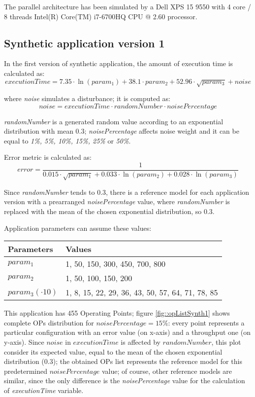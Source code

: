 The parallel architecture has been simulated by a Dell XPS 15 9550 with 4 core / 8 threads Intel(R) Core(TM) i7-6700HQ CPU @ 2.60 processor.


\subsection{Synthetic application version 1}

In the first version of synthetic application, the amount of execution time is calculated as:
\[
executionTime = 7.35 \cdot \ln{(param_1)} + 38.1 \cdot param_2 + 52.96 \cdot \sqrt{param_3} + noise
\]

where \textit{noise} simulates a disturbance; it is computed as:
\[
noise = executionTime \cdot randomNumber \cdot noisePercentage
\]

\textit{randomNumber} is a generated random value according to an exponential distribution with mean 0.3; \textit{noisePercentage} affects noise weight and it can be equal to \textit{1\%, 5\%, 10\%, 15\%, 25\%} or \textit{50\%}.

Error metric is calculated as:
\[
error = \dfrac{1}{0.015 \cdot \sqrt{param_1} + 0.033 \cdot \ln{(param_2)} + 0.028 \cdot \ln{(param_3)}}
\]

Since \textit{randomNumber} tends to 0.3, there is a reference model for each application version with a prearranged \textit{noisePercentage} value, where \textit{randomNumber} is replaced with the mean of the chosen exponential distribution, so 0.3.

Application parameters can assume these values:

\begin{center}

    \begin{tabular}{ll}
    
        \toprule
        Parameters & Values \\
        \midrule
        $param_1$ & 1, 50, 150, 300, 450, 700, 800 \\
        $param_2$ & 1, 50, 100, 150, 200 \\
        $param_3 (\cdot 10)$ & 1, 8, 15, 22, 29, 36, 43, 50, 57, 64, 71, 78, 85 \\
        \bottomrule 
    
    \end{tabular}

\end{center}

This application has 455 Operating Points; figure \ref{fig::opListSynth1} shows complete OPs distribution for $noisePercentage = 15\%$: every point represents a particular configuration with an error value (on x-axis) and a throughput one (on y-axis). Since $noise$ in $executionTime$ is affected by $randomNumber$, this plot consider its expected value, equal to the mean of the chosen exponential distribution (0.3); the obtained OPs list represents the reference model for this predetermined $noisePercentage$ value; of course, other reference models are similar, since the only difference is the \textit{noisePercentage} value for the calculation of \textit{executionTime} variable.

